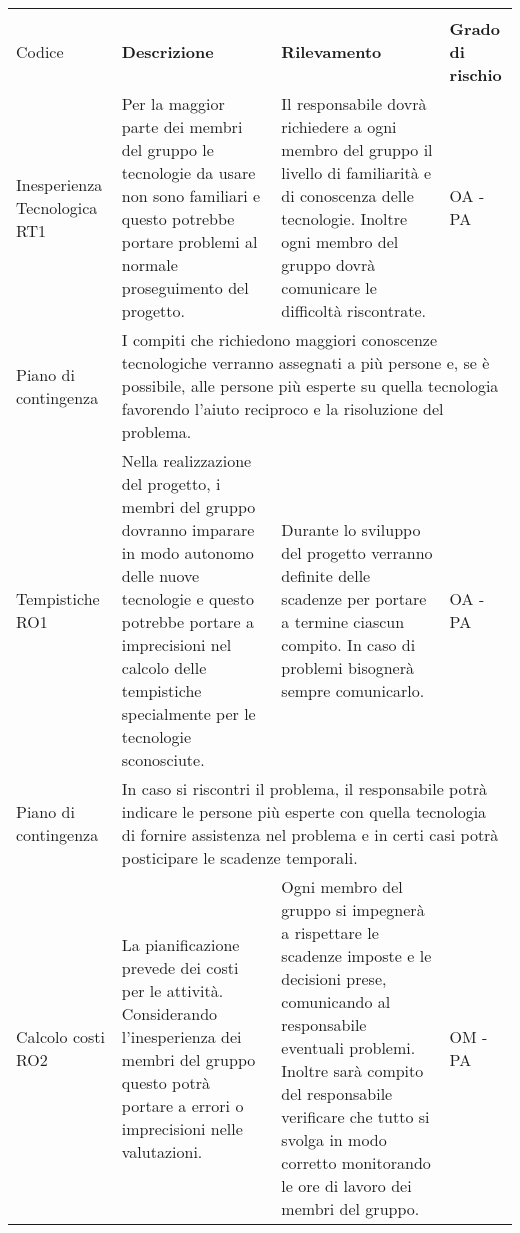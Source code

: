 \begin{center}
		\begin{longtable}{|p{}|p{}|p{}|p{}|}
			\hline
			\rowcolor{lighter-grayer}
			\centering\textbf{Nome \\ Codice} & \centering\textbf{Descrizione} & \centering\textbf{Rilevamento} & \textbf{Grado di rischio} \\
			\hline
			\endfirsthead
		
		\hline
		\centering Inesperienza Tecnologica RT1& Per la maggior parte dei membri del gruppo le tecnologie da usare non sono familiari e questo potrebbe portare problemi al normale proseguimento del progetto.  & Il responsabile dovrà richiedere a ogni membro del gruppo il livello di familiarità e di conoscenza delle tecnologie. Inoltre ogni membro del gruppo dovrà comunicare le difficoltà riscontrate. &  OA - PA \\
		\hline
		\centering Piano di contingenza & \multicolumn{3}{p{0.84\textwidth}}{I compiti che richiedono maggiori conoscenze tecnologiche verranno assegnati a più persone e, se è possibile, alle persone più esperte su quella tecnologia favorendo l'aiuto reciproco e la risoluzione del problema.} \\
		\hline
		\centering Tempistiche RO1& Nella realizzazione del progetto, i membri del gruppo dovranno imparare in modo autonomo delle nuove tecnologie e questo potrebbe portare a imprecisioni nel calcolo delle tempistiche specialmente per le tecnologie sconosciute. & Durante lo sviluppo del progetto verranno definite delle scadenze per portare a termine ciascun compito. In caso di problemi bisognerà sempre comunicarlo. & OA - PA \\
		\hline
		\centering Piano di contingenza & \multicolumn{3}{p{0.84\textwidth}}{In caso si riscontri il problema, il responsabile potrà indicare le persone più esperte con quella tecnologia di fornire assistenza nel problema e in certi casi potrà posticipare le scadenze temporali.} \\
		\hline
		\centering Calcolo costi RO2& La pianificazione prevede dei costi per le attività. Considerando l'inesperienza dei membri del gruppo questo potrà portare a errori o imprecisioni nelle valutazioni. & Ogni membro del gruppo si impegnerà a rispettare le scadenze imposte e le decisioni prese, comunicando al responsabile eventuali problemi. Inoltre sarà compito del responsabile verificare che tutto si svolga in modo corretto monitorando le ore di lavoro dei membri del gruppo. & OM - PA\\

\end{longtable}
\end{center}
